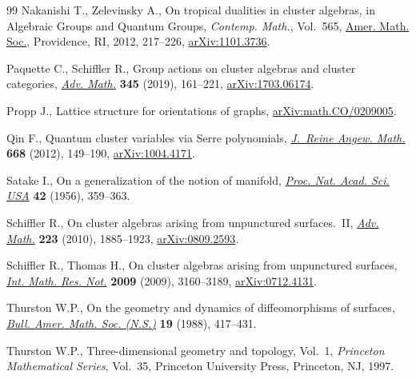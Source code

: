 \documentclass[pdftex]{sigma}%
\numberwithin{equation}{section}
\begin{document}
\begin{thebibliography}{99}
Nakanishi T., Zelevinsky A., On tropical dualities in cluster algebras, in
 Algebraic Groups and Quantum Groups, \textit{Contemp. Math.}, Vol.~565, \href{https://doi.org/10.1090/conm/565/11159}{Amer.
 Math. Soc.}, Providence, RI, 2012, 217--226, \href{https://arxiv.org/abs/1101.3736}{arXiv:1101.3736}.

Paquette C., Schiffler R., Group actions on cluster algebras and cluster
 categories, \href{https://doi.org/10.1016/j.aim.2019.01.009}{\textit{Adv. Math.}} \textbf{345} (2019), 161--221,
 \href{https://arxiv.org/abs/1703.06174}{arXiv:1703.06174}.

Propp J., Lattice structure for orientations of graphs,
 \href{https://arxiv.org/abs/math.CO/0209005}{arXiv:math.CO/0209005}.

Qin F., Quantum cluster variables via {S}erre polynomials, \href{https://doi.org/10.1515/crelle.2011.129}{\textit{J.~Reine
 Angew. Math.}} \textbf{668} (2012), 149--190, \href{https://arxiv.org/abs/1004.4171}{arXiv:1004.4171}.

Satake I., On a generalization of the notion of manifold, \href{https://doi.org/10.1073/pnas.42.6.359}{\textit{Proc. Nat.
 Acad. Sci. USA}} \textbf{42} (1956), 359--363.

Schiffler R., On cluster algebras arising from unpunctured surfaces.~{II},
 \href{https://doi.org/10.1016/j.aim.2009.10.015}{\textit{Adv. Math.}} \textbf{223} (2010), 1885--1923, \href{https://arxiv.org/abs/0809.2593}{arXiv:0809.2593}.

Schiffler R., Thomas H., On cluster algebras arising from unpunctured surfaces,
 \href{https://doi.org/10.1093/imrn/rnp047}{\textit{Int. Math. Res. Not.}} \textbf{2009} (2009), 3160--3189,
 \href{https://arxiv.org/abs/0712.4131}{arXiv:0712.4131}.

Thurston W.P., On the geometry and dynamics of diffeomorphisms of surfaces,
 \href{https://doi.org/10.1090/S0273-0979-1988-15685-6}{\textit{Bull. Amer. Math. Soc. (N.S.)}} \textbf{19} (1988), 417--431.

Thurston W.P., Three-dimensional geometry and topology, {V}ol.~1,
 \textit{Princeton Mathematical Series}, Vol.~35, Princeton University Press,
 Princeton, NJ, 1997.

\end{thebibliography}\LastPageEnding
\end{document}
